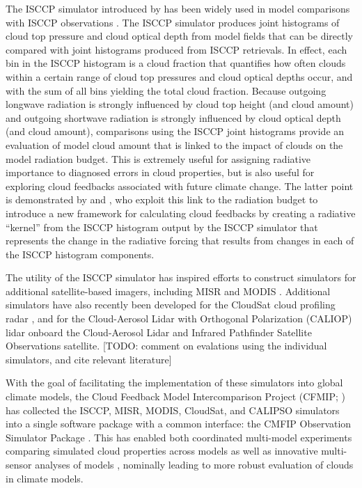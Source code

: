 The ISCCP simulator introduced by \citet{klein_and_jakob_1999} has been
widely used in model comparisons with ISCCP observations
\citep{webb_et_al_2001, norris_and_weaver_2001, lin_and_zhang_2004, zhang_et_al_2005, wyant_et_al_2006, klein_et_al_2013}.
The ISCCP simulator produces joint histograms of cloud top pressure and
cloud optical depth from model fields that can be directly compared with
joint histograms produced from ISCCP retrievals. In effect, each bin in
the ISCCP histogram is a cloud fraction that quantifies how often clouds
within a certain range of cloud top pressures and cloud optical depths
occur, and with the sum of all bins yielding the total cloud fraction.
Because outgoing longwave radiation is strongly influenced by cloud top
height (and cloud amount) and outgoing shortwave radiation is strongly
influenced by cloud optical depth (and cloud amount), comparisons using
the ISCCP joint histograms provide an evaluation of model cloud amount
that is linked to the impact of clouds on the model radiation budget.
This is extremely useful for assigning radiative importance to diagnosed
errors in cloud properties, but is also useful for exploring cloud
feedbacks associated with future climate change. The latter point is
demonstrated by \citet{zelinka_et_al_2012a} and
\citet{zelinka_et_al_2012b}, who exploit this link to the radiation
budget to introduce a new framework for calculating cloud feedbacks by
creating a radiative ``kernel'' from the ISCCP histogram output by the
ISCCP simulator that represents the change in the radiative forcing that
results from changes in each of the ISCCP histogram components.

The utility of the ISCCP simulator has inspired efforts to construct
simulators for additional satellite-based imagers, including MISR
\citep{marchand_and_ackerman_2010} and MODIS \citep{pincus_et_al_2012}.
Additional simulators have also recently been developed for the CloudSat
\citep{stephens_et_al_2002} cloud profiling radar
\citep[Quickbeam;][]{haynes_et_al_2007}, and for the Cloud-Aerosol Lidar
with Orthogonal Polarization (CALIOP) lidar \citep{chepfer_et_al_2008}
onboard the Cloud-Aerosol Lidar and Infrared Pathfinder Satellite
Observations \citep[CALIPSO][]{winker_et_al_2007} satellite. {[}TODO:
comment on evalations using the individual simulators, and cite relevant
literature{]}

With the goal of facilitating the implementation of these simulators
into global climate models, the Cloud Feedback Model Intercomparison
Project (CFMIP; \citep{webb_et_al_2016}) has collected the ISCCP, MISR,
MODIS, CloudSat, and CALIPSO simulators into a single software package
with a common interface: the CMFIP Observation Simulator Package
\citep[COSP;][]{bodas-salcedo_et_al_2011}. This has enabled both
coordinated multi-model experiments comparing simulated cloud properties
across models as well as innovative multi-sensor analyses of models
\citep[e.g.,][]{bodas-salcedo_et_al_2011, kay_et_al_2012, klein_et_al_2013},
nominally leading to more robust evaluation of clouds in climate models.

